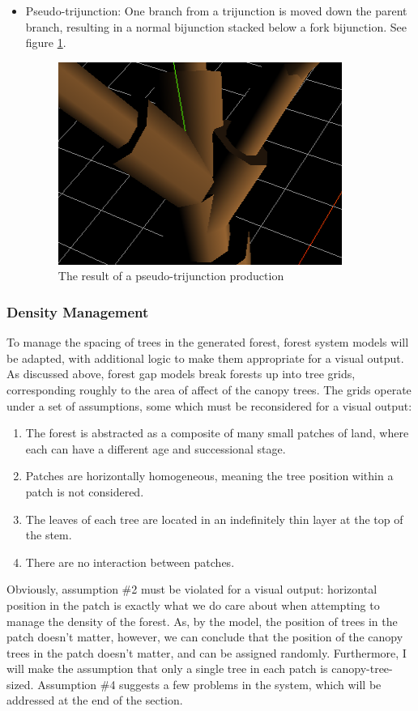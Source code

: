 \documentclass{article}
\newcommand{\tab}{\hspace*{2em}}
\begin{document}
\begin{itemize}
\begin{figure}[h]
        \end{figure}
        \item Pseudo-trijunction: One branch from a trijunction is moved down the parent
branch, resulting in a normal bijunction stacked below a fork bijunction. See figure
\ref{fig:fig/pseudotri}.
        \begin{figure}[h]
            \centering
            \includegraphics{fig/pseudotri}
            \caption[Pseudo-Trijunction]{The result of a pseudo-trijunction production}
            \label{fig:fig/pseudotri}

        \end{figure}
    \end{itemize}

            \subsubsection{Density Management}
    \tab To manage the spacing of trees in the generated forest, forest system models will be
adapted, with additional logic to make them appropriate for a visual output. As discussed above,
forest gap models break forests up into tree grids, corresponding roughly to the area of affect of
the canopy trees\cite{moorcroft01}. The grids operate under a set of assumptions\cite{bugmann01},
some which must be reconsidered for a visual output:
\begin{enumerate}
    \item The forest is abstracted as a composite of many small patches of land, where each can
have a different age and successional stage.
    \item Patches are horizontally homogeneous, meaning the tree position within a patch is not
considered.
    \item The leaves of each tree are located in an indefinitely thin layer at the top of the stem.
    \item There are no interaction between patches.
\end{enumerate}
    \tab Obviously, assumption \#2 must be violated for a visual output: horizontal position in the
patch is exactly what we do care about when attempting to manage the density of the forest. As,
by the model, the position of trees in the patch doesn't matter, however, we can conclude that the position of the canopy
trees in the patch doesn't matter, and can be assigned randomly. Furthermore, I will make the
assumption that only a single tree in each patch is canopy-tree-sized. Assumption \#4 suggests a
few problems in the system, which will be addressed at the end of the section.
\end{document}
